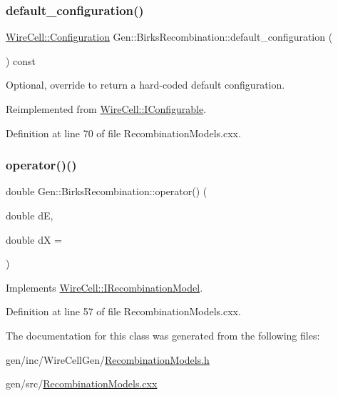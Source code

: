 \subsubsection{\texorpdfstring{default\+\_\+configuration()}{default\_configuration()}}
{\footnotesize\ttfamily \hyperlink{namespace_wire_cell_a9f705541fc1d46c608b3d32c182333ee}{Wire\+Cell\+::\+Configuration} Gen\+::\+Birks\+Recombination\+::default\+\_\+configuration (\begin{DoxyParamCaption}{ }\end{DoxyParamCaption}) const\hspace{0.3cm}{\ttfamily [virtual]}}



Optional, override to return a hard-\/coded default configuration. 



Reimplemented from \hyperlink{class_wire_cell_1_1_i_configurable_a54841b2da3d1ea02189478bff96f7998}{Wire\+Cell\+::\+I\+Configurable}.



Definition at line 70 of file Recombination\+Models.\+cxx.

\mbox{\label{class_wire_cell_1_1_gen_1_1_birks_recombination_afc95474baf06138cf5d52245137a5fd8}} 
\subsubsection{\texorpdfstring{operator()()}{operator()()}}
{\footnotesize\ttfamily double Gen\+::\+Birks\+Recombination\+::operator() (\begin{DoxyParamCaption}\item[{double}]{dE,  }\item[{double}]{dX = {} }\end{DoxyParamCaption})\hspace{0.3cm}{\ttfamily [virtual]}}



Implements \hyperlink{class_wire_cell_1_1_i_recombination_model_a600558009b672e93219962f364829e00}{Wire\+Cell\+::\+I\+Recombination\+Model}.



Definition at line 57 of file Recombination\+Models.\+cxx.



The documentation for this class was generated from the following files\+:\begin{DoxyCompactItemize}
\item 
gen/inc/\+Wire\+Cell\+Gen/\hyperlink{_recombination_models_8h}{Recombination\+Models.\+h}\item 
gen/src/\hyperlink{_recombination_models_8cxx}{Recombination\+Models.\+cxx}\end{DoxyCompactItemize}
